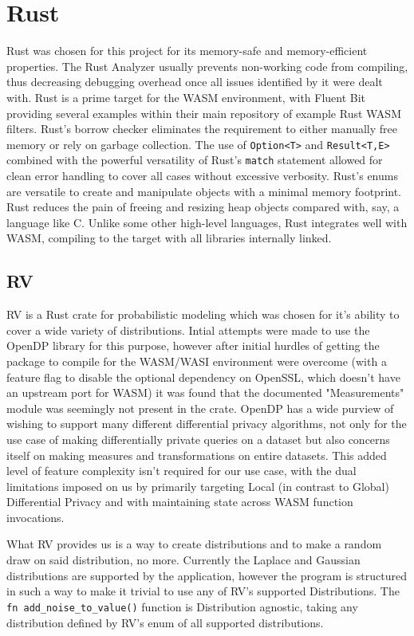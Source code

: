 \section{Rust}
Rust was chosen for this project for its memory-safe and memory-efficient properties. The Rust Analyzer usually prevents non-working code from compiling, thus decreasing debugging overhead once all issues identified by it were dealt with. Rust is a prime target for the WASM environment, with Fluent Bit providing several examples within their main repository of example Rust WASM filters. Rust's borrow checker eliminates the requirement to either manually free memory or rely on garbage collection. The use of \texttt{Option<T>} and \texttt{Result<T,E>} combined with the powerful versatility of Rust's \texttt{match} statement allowed for clean error handling to cover all cases without excessive verbosity. Rust's enums are versatile to create and manipulate objects with a minimal memory footprint. Rust reduces the pain of freeing and resizing heap objects compared with, say, a language like C. Unlike some other high-level languages, Rust integrates well with WASM, compiling to the target with all libraries internally linked. 

\subsection{RV}
RV is a Rust crate for probabilistic modeling which was chosen for it's ability to cover a wide variety of distributions. Intial attempts were made to use the OpenDP library for this purpose, however after initial hurdles of getting the package to compile for the WASM/WASI environment were overcome (with a feature flag to disable the optional dependency on OpenSSL, which doesn't have an upstream port for WASM) it was found that the documented "Measurements" module was seemingly not present in the crate. OpenDP has a wide purview of wishing to support many different differential privacy algorithms, not only for the use case of making differentially private queries on a dataset but also concerns itself on making measures and transformations on entire datasets. This added level of feature complexity isn't required for our use case, with the dual limitations imposed on us by primarily targeting Local (in contrast to Global) Differential Privacy and with maintaining state across WASM function invocations.   

What RV provides us is a way to create distributions and to make a random draw on said distribution, no more. Currently the Laplace and Gaussian distributions are supported by the application, however the program is structured in such a way to make it trivial to use any of RV's supported Distributions. The \texttt{fn add\_noise\_to\_value()} function is Distribution agnostic, taking any distribution defined by RV's enum of all supported distributions.

